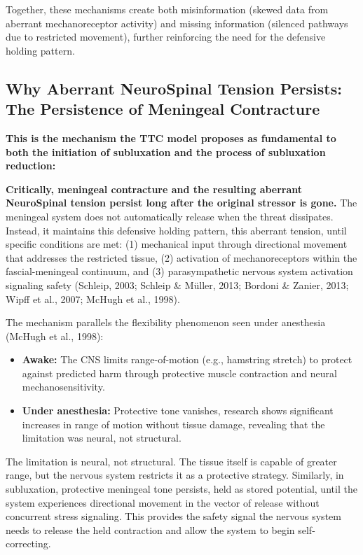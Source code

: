 \documentclass[11pt,letterpaper]{article}
\begin{document}
Together, these mechanisms create both misinformation (skewed data from aberrant mechanoreceptor activity) and missing information (silenced pathways due to restricted movement), further reinforcing the need for the defensive holding pattern.


\subsection{Why Aberrant NeuroSpinal Tension Persists: The Persistence of Meningeal Contracture}

\textbf{This is the mechanism the TTC model proposes as fundamental to both the initiation of subluxation and the process of subluxation reduction:}


\textbf{Critically, meningeal contracture and the resulting aberrant NeuroSpinal tension persist long after the original stressor is gone.} The meningeal system does not automatically release when the threat dissipates. Instead, it maintains this defensive holding pattern, this aberrant tension, until specific conditions are met: (1) mechanical input through directional movement that addresses the restricted tissue, (2) activation of mechanoreceptors within the fascial-meningeal continuum, and (3) parasympathetic nervous system activation signaling safety (Schleip, 2003; Schleip \& Müller, 2013; Bordoni \& Zanier, 2013; Wipff et al., 2007; McHugh et al., 1998).


The mechanism parallels the flexibility phenomenon seen under anesthesia (McHugh et al., 1998):


\begin{itemize}
\item \textbf{Awake:} The CNS limits range-of-motion (e.g., hamstring stretch) to protect against predicted harm through protective muscle contraction and neural mechanosensitivity.
\end{itemize}

\begin{itemize}
\item \textbf{Under anesthesia:} Protective tone vanishes, research shows significant increases in range of motion without tissue damage, revealing that the limitation was neural, not structural.
\end{itemize}

The limitation is neural, not structural. The tissue itself is capable of greater range, but the nervous system restricts it as a protective strategy. Similarly, in subluxation, protective meningeal tone persists, held as stored potential, until the system experiences directional movement in the vector of release without concurrent stress signaling. This provides the safety signal the nervous system needs to release the held contraction and allow the system to begin self-correcting.
\end{document}
